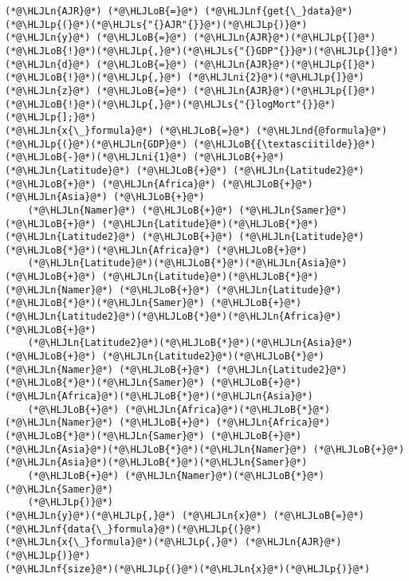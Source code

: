 \documentclass[12pt,a4paper]{article}
\newcommand{\HLJLn}[1]{#1}
\newcommand{\HLJLnd}[1]{\textcolor[RGB]{214,102,97}{#1}}
\newcommand{\HLJLnf}[1]{\textcolor[RGB]{66,102,213}{#1}}
\newcommand{\HLJLs}[1]{\textcolor[RGB]{201,61,57}{#1}}
\newcommand{\HLJLni}[1]{\textcolor[RGB]{59,151,46}{#1}}
\newcommand{\HLJLoB}[1]{\textcolor[RGB]{102,102,102}{\textbf{#1}}}
\newcommand{\HLJLp}[1]{#1}
\begin{document}
\begin{lstlisting}
(*@\HLJLn{AJR}@*) (*@\HLJLoB{=}@*) (*@\HLJLnf{get{\_}data}@*)(*@\HLJLp{(}@*)(*@\HLJLs{"{}AJR"{}}@*)(*@\HLJLp{)}@*)
(*@\HLJLn{y}@*) (*@\HLJLoB{=}@*) (*@\HLJLn{AJR}@*)(*@\HLJLp{[}@*)(*@\HLJLoB{!}@*)(*@\HLJLp{,}@*)(*@\HLJLs{"{}GDP"{}}@*)(*@\HLJLp{]}@*)
(*@\HLJLn{d}@*) (*@\HLJLoB{=}@*) (*@\HLJLn{AJR}@*)(*@\HLJLp{[}@*)(*@\HLJLoB{!}@*)(*@\HLJLp{,}@*) (*@\HLJLni{2}@*)(*@\HLJLp{]}@*)
(*@\HLJLn{z}@*) (*@\HLJLoB{=}@*) (*@\HLJLn{AJR}@*)(*@\HLJLp{[}@*)(*@\HLJLoB{!}@*)(*@\HLJLp{,}@*)(*@\HLJLs{"{}logMort"{}}@*)(*@\HLJLp{];}@*)
(*@\HLJLn{x{\_}formula}@*) (*@\HLJLoB{=}@*) (*@\HLJLnd{@formula}@*)(*@\HLJLp{(}@*)(*@\HLJLn{GDP}@*) (*@\HLJLoB{{\textasciitilde}}@*) (*@\HLJLoB{-}@*)(*@\HLJLni{1}@*) (*@\HLJLoB{+}@*) (*@\HLJLn{Latitude}@*) (*@\HLJLoB{+}@*) (*@\HLJLn{Latitude2}@*) (*@\HLJLoB{+}@*) (*@\HLJLn{Africa}@*) (*@\HLJLoB{+}@*) (*@\HLJLn{Asia}@*) (*@\HLJLoB{+}@*) 
    (*@\HLJLn{Namer}@*) (*@\HLJLoB{+}@*) (*@\HLJLn{Samer}@*) (*@\HLJLoB{+}@*) (*@\HLJLn{Latitude}@*)(*@\HLJLoB{*}@*)(*@\HLJLn{Latitude2}@*) (*@\HLJLoB{+}@*) (*@\HLJLn{Latitude}@*)(*@\HLJLoB{*}@*)(*@\HLJLn{Africa}@*) (*@\HLJLoB{+}@*) 
    (*@\HLJLn{Latitude}@*)(*@\HLJLoB{*}@*)(*@\HLJLn{Asia}@*) (*@\HLJLoB{+}@*) (*@\HLJLn{Latitude}@*)(*@\HLJLoB{*}@*)(*@\HLJLn{Namer}@*) (*@\HLJLoB{+}@*) (*@\HLJLn{Latitude}@*)(*@\HLJLoB{*}@*)(*@\HLJLn{Samer}@*) (*@\HLJLoB{+}@*) (*@\HLJLn{Latitude2}@*)(*@\HLJLoB{*}@*)(*@\HLJLn{Africa}@*) (*@\HLJLoB{+}@*)
    (*@\HLJLn{Latitude2}@*)(*@\HLJLoB{*}@*)(*@\HLJLn{Asia}@*) (*@\HLJLoB{+}@*) (*@\HLJLn{Latitude2}@*)(*@\HLJLoB{*}@*)(*@\HLJLn{Namer}@*) (*@\HLJLoB{+}@*) (*@\HLJLn{Latitude2}@*)(*@\HLJLoB{*}@*)(*@\HLJLn{Samer}@*) (*@\HLJLoB{+}@*) (*@\HLJLn{Africa}@*)(*@\HLJLoB{*}@*)(*@\HLJLn{Asia}@*) 
    (*@\HLJLoB{+}@*) (*@\HLJLn{Africa}@*)(*@\HLJLoB{*}@*)(*@\HLJLn{Namer}@*) (*@\HLJLoB{+}@*) (*@\HLJLn{Africa}@*)(*@\HLJLoB{*}@*)(*@\HLJLn{Samer}@*) (*@\HLJLoB{+}@*) (*@\HLJLn{Asia}@*)(*@\HLJLoB{*}@*)(*@\HLJLn{Namer}@*) (*@\HLJLoB{+}@*) (*@\HLJLn{Asia}@*)(*@\HLJLoB{*}@*)(*@\HLJLn{Samer}@*)
    (*@\HLJLoB{+}@*) (*@\HLJLn{Namer}@*)(*@\HLJLoB{*}@*)(*@\HLJLn{Samer}@*)
    (*@\HLJLp{)}@*)
(*@\HLJLn{y}@*)(*@\HLJLp{,}@*) (*@\HLJLn{x}@*) (*@\HLJLoB{=}@*) (*@\HLJLnf{data{\_}formula}@*)(*@\HLJLp{(}@*)(*@\HLJLn{x{\_}formula}@*)(*@\HLJLp{,}@*) (*@\HLJLn{AJR}@*)(*@\HLJLp{)}@*)
(*@\HLJLnf{size}@*)(*@\HLJLp{(}@*)(*@\HLJLn{x}@*)(*@\HLJLp{)}@*)
\end{lstlisting}
\end{document}
